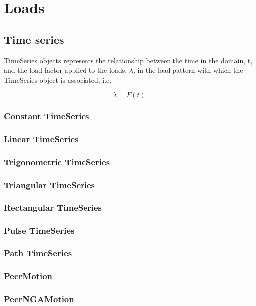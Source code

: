 \chapter{Loads} \label{ch_loads}

\section{Time series}
TimeSeries objects represents the relationship between the time in the domain, t, and the load factor applied to the loads, $\lambda$, in the load pattern with which the TimeSeries object is associated, i.e.

\begin{equation}
  \lambda= F(t)
\end{equation}

\subsection{Constant TimeSeries}

\subsection{Linear TimeSeries}

\subsection{Trigonometric TimeSeries}

\subsection{Triangular TimeSeries}

\subsection{Rectangular TimeSeries}

\subsection{Pulse TimeSeries}

\subsection{Path TimeSeries}

\subsection{PeerMotion}

\subsection{PeerNGAMotion}
